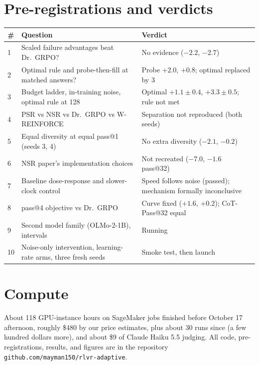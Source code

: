 \documentclass[11pt]{article}
\begin{document}
\section{Pre-registrations and verdicts}
\begin{table}[H]
\centering\small
\begin{tabularx}{\linewidth}{@{}lYl@{}}
\toprule
\textbf{\#} & \textbf{Question} & \textbf{Verdict}\\
 & Scaled failure advantages beat Dr.\ GRPO? & No evidence ($-2.2$, $-2.7$)\\
2 & Optimal rule and probe-then-fill at matched answers? & Probe $+2.0$, $+0.8$; optimal replaced by 3\\
3 & Budget ladder, in-training noise, optimal rule at 128 & Optimal $+1.1\pm0.4$, $+3.3\pm0.5$; rule not met\\
4 & PSR vs NSR vs Dr.\ GRPO vs W-REINFORCE & Separation not reproduced (both seeds)\\
5 & Equal diversity at equal pass@1 (seeds 3, 4) & No extra diversity ($-2.1$, $-0.2$)\\
6 & NSR paper's implementation choices & Not recreated ($-7.0$, $-1.6$ pass@32)\\
7 & Baseline dose-response and slower-clock control & Speed follows noise (passed); mechanism formally inconclusive\\
8 & pass@4 objective vs Dr.\ GRPO & Curve fixed ($+1.6$, $+0.2$); CoT-Pass@32 equal\\
9 & Second model family (OLMo-2-1B), intervals & Running\\
10 & Noise-only intervention, learning-rate arms, three fresh seeds & Smoke test, then launch\\
\bottomrule
\end{tabularx}
\end{table}

\section{Compute}
About 118 GPU-instance hours on SageMaker jobs finished before October 17 afternoon, roughly \$480 by our price estimates, plus about 30 runs since (a few hundred dollars more), and about \$9 of Claude Haiku 5.5 judging. All code, pre-registrations, results, and figures are in the repository \texttt{github.com/mayman150/rlvr-adaptive}.
\end{document}
